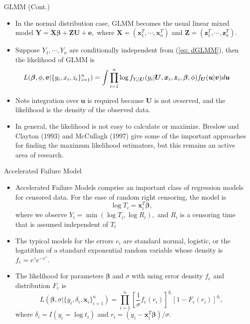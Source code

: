 \documentclass{beamer}
\begin{document}
        \begin{frame}{GLMM (Cont.)}
        \begin{itemize}
            \item In the normal distribution case, GLMM becomes the usual linear mixed model $\boldsymbol{Y} = \boldsymbol{X}\boldsymbol{\beta} +  \boldsymbol{Z}\boldsymbol{U} + \boldsymbol{e},$ where $\mathbf{X} = (\mathbf{x}^{T}_{1}, \cdots, \mathbf{x}^{T}_{n} )$ and $\mathbf{Z} = (\mathbf{z}^{T}_{1}, \cdots, \mathbf{z}^{T}_{n}).$ 
            \item Suppose $Y_{1}, \cdots, Y_{n}$ are conditionally independent from (\ref{eq: dGLMM}), then the likelihood of GLMM is
            $$\hspace{- 0.5 cm} L(\boldsymbol{\beta}, \phi, \boldsymbol{v}|\{y_{i}, x_{i}, z_{i}\}^{n}_{i=1}) = \int \prod^{n}_{i=1} \log f_{Y_{i}|\boldsymbol{U}}(y_{i}|\boldsymbol{U}, \boldsymbol{x}_{i}, \boldsymbol{z}_{i}, \boldsymbol{\beta}, \phi)f_{\boldsymbol{U}}(\boldsymbol{u}|\boldsymbol{v})d\boldsymbol{u}
            $$
            \item Note integration over $\boldsymbol{u}$ is required because $\mathbf{U}$ is not ovserved, and the likelihood is the density of the observed data.
            \item In general, the likelihood is not easy to calculate or maximize. Breslow and Clayton (1993) and McCullagh (1997) give some of the important approaches for finding the maximum likelihood estimators, but this remains an active area of research. 
        \end{itemize} 
        \end{frame}



       \begin{frame}{Accelerated Failure Model}
        \begin{itemize}
            \item Accelerated Failure Models comprise an important class of regression models for censored data. For the ease of random right censoring, the model is 
            $$\log T_{i} = \boldsymbol{x}^{T}_{i}\boldsymbol{\beta}, $$
            where we observe $Y_{i} = \min\left(\log T_{i}, \log R_{i}\right),$ and $R_{i}$ is a censoring time that is assumed independent of $T_{t}$
            \item The typical models for the errors $e_{i}$ are standard normal, logistic, or the logatithm of a standard exponential random variable whose density is $f_{e} = e^{z}e^{-e^{z}}$.
            \item The likelihood for parameters $\boldsymbol{\beta}$ and $\sigma$ with using error density $f_{e}$ and distribution $F_{e}$ is 
            $$L(\boldsymbol{\beta}, \sigma|\{y_{i}, \delta_{i}, \boldsymbol{x}_{i}\}^{n}_{i=1}) = \prod^{n}_{i=1}\left[\frac{1}{\sigma}f_{e}(r_{i})\right]^{\delta_{i}}\left[1 - F_{e}(r_{i})\right]^{\delta_{i}},$$
            where $\delta_{i} = I(y_{i} = \log t_{i})$ and $r_{i} = (y_{i} - \boldsymbol{x}^{T}_{i}\boldsymbol{\beta})/\sigma.$ 
           
        \end{itemize}
    \end{frame}
    
\end{document}
